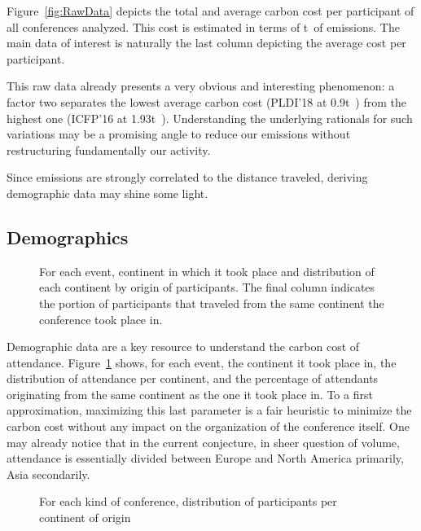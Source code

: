 \documentclass{scrartcl}
\newcommand{\gazunitbis}{\si{\tonne\of{CO_2e}}}
\newcommand{\event}{event} %
\begin{document}
Figure~\ref{fig:RawData} depicts the total and average carbon cost per participant of
all conferences analyzed. This cost is estimated in terms of \gazunitbis of emissions.
The main data of interest is naturally the last column depicting the average cost per participant.

This raw data already presents a very obvious and interesting phenomenon: a
factor two separates the lowest average carbon cost (PLDI'18 at 0.9\gazunitbis)
from the highest one (ICFP'16 at 1.93\gazunitbis).
Understanding the underlying rationals for such variations may be a promising
angle to reduce our emissions without restructuring fundamentally our activity.

Since emissions are strongly correlated to the distance traveled, deriving
demographic data may shine some light.

\subsection{Demographics}
\label{subsec:demo}

\begin{figure}
  \caption{For each \event, continent in which it took place and distribution of
    each continent by origin of participants. The final column indicates the
    portion of participants that traveled from the same continent the
    conference took place in.}
  \label{fig:demo-raw}
\end{figure}

Demographic data are a key resource to understand the carbon cost of attendance.
Figure~\ref{fig:demo-raw} shows, for each \event, the
continent it took place in, the distribution of attendance per continent, and
the percentage of attendants originating from the same continent as the one it
took place in. To a first approximation, maximizing this last parameter is a fair
heuristic to minimize the carbon cost without any impact on the organization of
the conference itself. One may already notice that in the current conjecture, in
sheer question of volume, attendance is essentially divided between Europe and
North America primarily, Asia secondarily.

\begin{figure}
\caption{For each kind of conference, distribution of participants per continent of origin}
\label{fig:demo-conf}
\end{figure}
\end{document}
